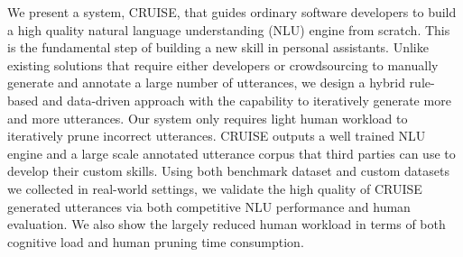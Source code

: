 We present a system, CRUISE, that guides ordinary software developers to build a high quality natural language understanding (NLU) engine from scratch. This is the fundamental step of building a new skill in personal assistants. Unlike existing solutions that require either developers or crowdsourcing to manually generate and annotate a large number of utterances, we design a hybrid rule-based and data-driven approach with the capability to iteratively generate more and more utterances. Our system only requires light human workload to iteratively prune incorrect utterances. CRUISE outputs a well trained NLU engine and a large scale annotated utterance corpus that third parties can use to develop their custom skills. Using both benchmark dataset and custom datasets we collected in real-world settings, we validate the high quality of CRUISE generated utterances via both competitive NLU performance and human evaluation. We also show the largely reduced human workload in terms of both cognitive load and human pruning time consumption.
